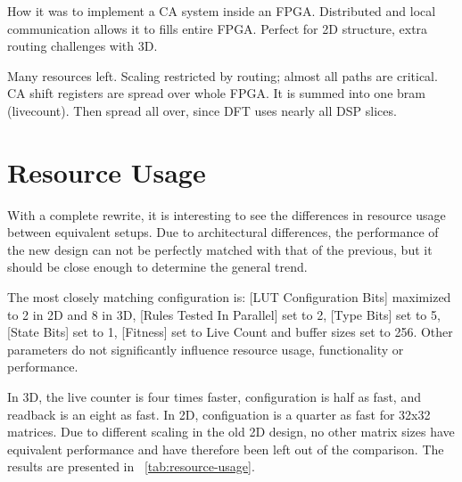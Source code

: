 \TODO
How it was to implement a CA system inside an FPGA.
Distributed and local communication allows it to fills entire FPGA.
Perfect for 2D structure, extra routing challenges with 3D.

\TODO
Many resources left.
Scaling restricted by routing; almost all paths are critical.
CA shift registers are spread over whole FPGA.
It is summed into one bram (livecount).
Then spread all over, since DFT uses nearly all DSP slices.


\section{Resource Usage}

With a complete rewrite, it is interesting to see the differences in resource usage between equivalent setups.
Due to architectural differences, the performance of the new design can not be perfectly matched with that of the previous, but it should be close enough to determine the general trend.

The most closely matching configuration is:
[LUT Configuration Bits] maximized to 2 in 2D and 8 in 3D,
[Rules Tested In Parallel] set to 2,
[Type Bits] set to 5,
[State Bits] set to 1,
[Fitness] set to Live Count
and buffer sizes set to 256.
Other parameters do not significantly influence resource usage, functionality or performance.

In 3D, the live counter is four times faster, configuration is half as fast, and readback is an eight as fast.
In 2D, configuation is a quarter as fast for 32x32 matrices.
Due to different scaling in the old 2D design, no other matrix sizes have equivalent performance and have therefore been left out of the comparison.
The results are presented in \tablename~\ref{tab:resource-usage}.

